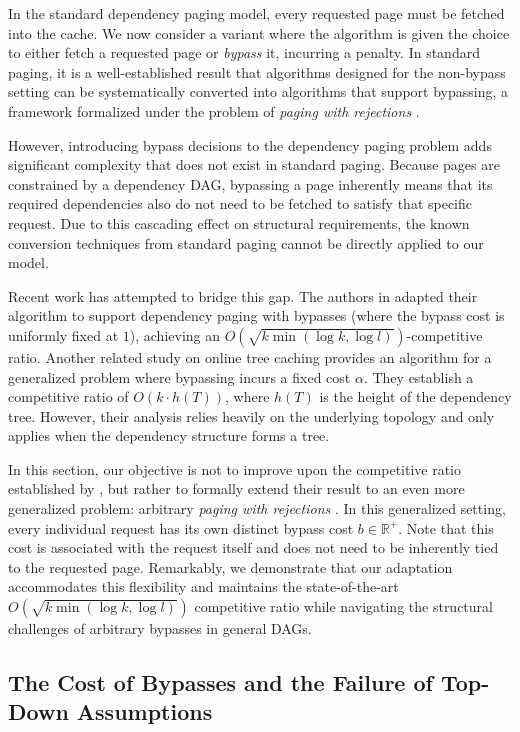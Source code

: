 \documentclass[a4paper]{article}
\begin{document}
In the standard dependency paging model, every requested page must be fetched into the cache. We now consider a variant where the algorithm is given the choice to either fetch a requested page or \textit{bypass} it, incurring a penalty. In standard paging, it is a well-established result that algorithms designed for the non-bypass setting can be systematically converted into algorithms that support bypassing, a framework formalized under the problem of \textit{paging with rejections} \cite{Epsteinetal2013}.

However, introducing bypass decisions to the dependency paging problem adds significant complexity that does not exist in standard paging. Because pages are constrained by a dependency DAG, bypassing a page inherently means that its required dependencies also do not need to be fetched to satisfy that specific request. Due to this cascading effect on structural requirements, the known conversion techniques from standard paging cannot be directly applied to our model.

Recent work has attempted to bridge this gap. The authors in \cite{dallot2024dependency} adapted their algorithm to support dependency paging with bypasses (where the bypass cost is uniformly fixed at $1$), achieving an $O\left(\sqrt{k \min(\log k, \log l)}\right)$-competitive ratio. Another related study on online tree caching \cite{Bienkowskietal2016} provides an algorithm for a generalized problem where bypassing incurs a fixed cost $\alpha$. They establish a competitive ratio of $O(k \cdot h(T))$, where $h(T)$ is the height of the dependency tree. However, their analysis relies heavily on the underlying topology and only applies when the dependency structure forms a tree.

In this section, our objective is not to improve upon the competitive ratio established by \cite{dallot2024dependency}, but rather to formally extend their result to an even more generalized problem: arbitrary \textit{paging with rejections} \cite{Epsteinetal2013}. In this generalized setting, every individual request has its own distinct bypass cost $b \in \mathbb{R}^+$. Note that this cost is associated with the request itself and does not need to be inherently tied to the requested page. Remarkably, we demonstrate that our adaptation accommodates this flexibility and maintains the state-of-the-art $O\left(\sqrt{k \min(\log k, \log l)}\right)$ competitive ratio while navigating the structural challenges of arbitrary bypasses in general DAGs.

\subsection*{The Cost of Bypasses and the Failure of Top-Down Assumptions}
\end{document}
